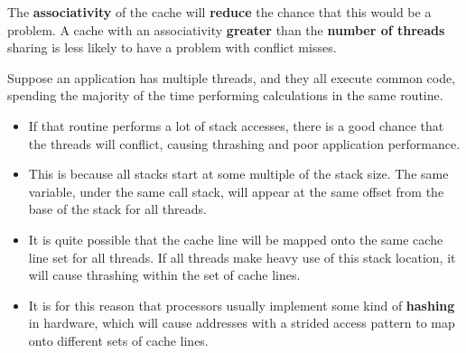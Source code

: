 \documentclass[12pt,a4paper]{report}
\begin{document}
\par
The \textbf{associativity} of the cache will \textbf{reduce} the chance that this would be a problem. A cache with an associativity \textbf{greater} than the \textbf{number of threads} sharing is less likely to have a problem with conflict misses.
\par
Suppose an application has multiple threads, and they all execute common code, spending the majority of the time performing calculations in the same routine. 
\begin{itemize}
	\item If that routine performs a lot of stack accesses, there is a good chance that the threads will conflict, causing thrashing and poor application performance.
	\item  This is because all stacks start at some multiple of the stack size. The same variable, under the same call stack, will appear at the same offset from the base of the stack for all threads.
	\item It is quite possible that the cache line will be mapped onto the same cache line set for all threads. If all threads make heavy use of this stack location, it will cause thrashing within the set of cache lines.
	\item It is for this reason that processors usually implement some kind of \textbf{hashing} in hardware, which will cause addresses with a strided access pattern to map onto different sets of cache lines. 
\end{itemize}
\end{document}
